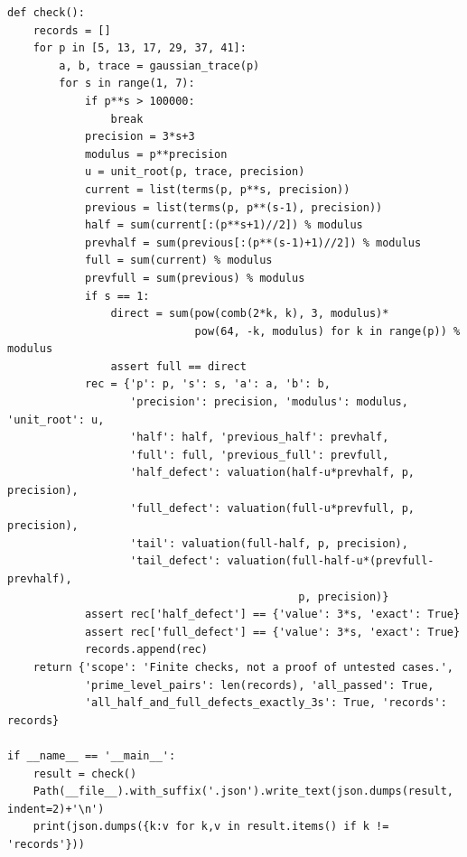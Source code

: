 \documentclass[11pt,a4paper]{article}
\begin{document}
\begin{lstlisting}
def check():
    records = []
    for p in [5, 13, 17, 29, 37, 41]:
        a, b, trace = gaussian_trace(p)
        for s in range(1, 7):
            if p**s > 100000:
                break
            precision = 3*s+3
            modulus = p**precision
            u = unit_root(p, trace, precision)
            current = list(terms(p, p**s, precision))
            previous = list(terms(p, p**(s-1), precision))
            half = sum(current[:(p**s+1)//2]) % modulus
            prevhalf = sum(previous[:(p**(s-1)+1)//2]) % modulus
            full = sum(current) % modulus
            prevfull = sum(previous) % modulus
            if s == 1:
                direct = sum(pow(comb(2*k, k), 3, modulus)*
                             pow(64, -k, modulus) for k in range(p)) % modulus
                assert full == direct
            rec = {'p': p, 's': s, 'a': a, 'b': b,
                   'precision': precision, 'modulus': modulus, 'unit_root': u,
                   'half': half, 'previous_half': prevhalf,
                   'full': full, 'previous_full': prevfull,
                   'half_defect': valuation(half-u*prevhalf, p, precision),
                   'full_defect': valuation(full-u*prevfull, p, precision),
                   'tail': valuation(full-half, p, precision),
                   'tail_defect': valuation(full-half-u*(prevfull-prevhalf),
                                             p, precision)}
            assert rec['half_defect'] == {'value': 3*s, 'exact': True}
            assert rec['full_defect'] == {'value': 3*s, 'exact': True}
            records.append(rec)
    return {'scope': 'Finite checks, not a proof of untested cases.',
            'prime_level_pairs': len(records), 'all_passed': True,
            'all_half_and_full_defects_exactly_3s': True, 'records': records}

if __name__ == '__main__':
    result = check()
    Path(__file__).with_suffix('.json').write_text(json.dumps(result, indent=2)+'\n')
    print(json.dumps({k:v for k,v in result.items() if k != 'records'}))


\end{lstlisting}
\end{document}
